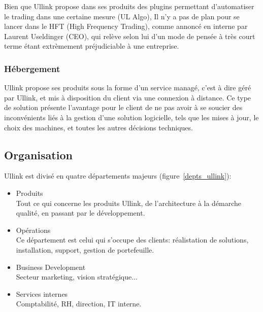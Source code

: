 \documentclass[a4paper, 12pt]{article}
\begin{document}
Bien que Ullink propose dans ses produits des plugins permettant d'automatiser le trading dans une certaine mesure (UL Algo), Il n'y a pas de plan pour se lancer dans le HFT (High Frequency Trading), comme annoncé en interne par Laurent Useldinger (CEO), qui relève selon lui d'un mode de pensée à très court terme étant extrèmement préjudiciable à une entreprise.

\subsubsection{Hébergement}

Ullink propose ses produits sous la forme d'un service managé, c'est à dire géré par Ullink, et mis à disposition du client via une connexion à distance. Ce type de solution présente l'avantage pour le client de ne pas avoir à se soucier des inconvénients liés à la gestion d'une solution logicielle, tels que les mises à jour, le choix des machines, et toutes les autres décisions techniques.

\subsection{Organisation}

Ullink est divisé en quatre départements majeurs (figure~\ref{depts_ullink}):

\begin{itemize}
\item Produits\\
Tout ce qui concerne les produits Ullink, de l'architecture à la démarche qualité, en passant par le développement.

\item Opérations\\
Ce département est celui qui s'occupe des clients: réalistation de solutions, installation, support, gestion de portefeuille.

\item Business Development\\
Secteur marketing, vision stratégique...

\item Services internes\\
Comptabilité, RH, direction, IT interne.
\end{itemize}
\end{document}

